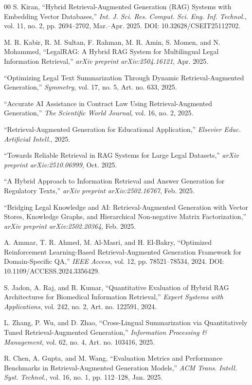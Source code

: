 \documentclass[conference]{IEEEtran}
\begin{document}
\begin{thebibliography}{00}
 S. Kiran, ``Hybrid Retrieval-Augmented Generation (RAG) Systems with Embedding Vector Databases,'' \textit{Int. J. Sci. Res. Comput. Sci. Eng. Inf. Technol.}, vol. 11, no. 2, pp. 2694--2702, Mar.--Apr. 2025. DOI: 10.32628/CSEIT25112702.

 M. R. Kabir, R. M. Sultan, F. Rahman, M. R. Amin, S. Momen, and N. Mohammed, ``LegalRAG: A Hybrid RAG System for Multilingual Legal Information Retrieval,'' \textit{arXiv preprint arXiv:2504.16121}, Apr. 2025.

 ``Optimizing Legal Text Summarization Through Dynamic Retrieval-Augmented Generation,'' \textit{Symmetry}, vol. 17, no. 5, Art. no. 633, 2025.

 ``Accurate AI Assistance in Contract Law Using Retrieval-Augmented Generation,'' \textit{The Scientific World Journal}, vol. 16, no. 2, 2025.

 ``Retrieval-Augmented Generation for Educational Application,'' \textit{Elsevier Educ. Artificial Intell.}, 2025.

 ``Towards Reliable Retrieval in RAG Systems for Large Legal Datasets,'' \textit{arXiv preprint arXiv:2510.06999}, Oct. 2025.

 ``A Hybrid Approach to Information Retrieval and Answer Generation for Regulatory Texts,'' \textit{arXiv preprint arXiv:2502.16767}, Feb. 2025.

 ``Bridging Legal Knowledge and AI: Retrieval-Augmented Generation with Vector Stores, Knowledge Graphs, and Hierarchical Non-negative Matrix Factorization,'' \textit{arXiv preprint arXiv:2502.20364}, Feb. 2025.

 A. Ammar, T. R. Ahmed, M. Al-Masri, and H. El-Bakry, ``Optimized Reinforcement Learning-Based Retrieval-Augmented Generation Framework for Domain-Specific QA,'' \textit{IEEE Access}, vol. 12, pp. 78521--78534, 2024. DOI: 10.1109/ACCESS.2024.3356429.

 S. Jadon, A. Raj, and R. Kumar, ``Quantitative Evaluation of Hybrid RAG Architectures for Biomedical Information Retrieval,'' \textit{Expert Systems with Applications}, vol. 242, no. 2, Art. no. 122591, 2024.

 L. Zhang, P. Wu, and D. Zhao, ``Cross-Lingual Summarization via Quantitatively Tuned Retrieval-Augmented Generation,'' \textit{Information Processing \& Management}, vol. 62, no. 4, Art. no. 103416, 2025.

 R. Chen, A. Gupta, and M. Wang, ``Evaluation Metrics and Performance Benchmarks in Retrieval-Augmented Generation Models,'' \textit{ACM Trans. Intell. Syst. Technol.}, vol. 16, no. 1, pp. 112--128, Jan. 2025.


\end{thebibliography}
\end{document}
